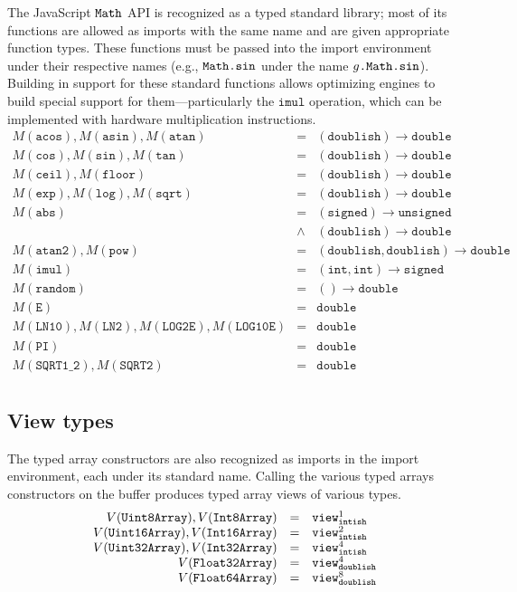 \documentclass{article}
\newcommand{\funty}[2]{({#1}) \rightarrow {#2}}
\newcommand{\mathjs}[1]{\mbox{\texttt{{#1}}}}
\newcommand{\mathjssm}[1]{\mbox{\texttt{\scriptsize {#1}}}}
\newcommand{\unsigned}{\mathtt{unsigned}}
\newcommand{\intsm}{\mathjssm{intish}}
\newcommand{\doublesm}{\mathjssm{doublish}}
\newcommand{\signed}{\mathtt{signed}}
\newcommand{\double}{\mathtt{double}}
\newcommand{\view}[2]{\mathtt{view}^{#1}_{#2}}
\renewcommand{\int}{\mathtt{int}}
\newcommand{\imul}{\mathtt{imul}}
\newcommand{\doublish}{\mathtt{doublish}}
\begin{document}
The JavaScript $\mathjs{Math}$ API is recognized as a typed standard
library; most of its functions are allowed as imports with the same
name and are given appropriate function types. These functions must be
passed into the import environment under their respective names (e.g.,
$\mathjs{Math.sin}$ under the name $g\mathjs{.Math.sin}$). Building in
support for these standard functions allows optimizing engines to
build special support for them---particularly the $\imul$ operation,
which can be implemented with hardware multiplication instructions.
\[
\begin{array}{rcl}
M(\mathtt{acos}), M(\mathtt{asin}), M(\mathtt{atan}) & = & \funty{\doublish}{\double} \\
M(\mathtt{cos}), M(\mathtt{sin}), M(\mathtt{tan})    & = & \funty{\doublish}{\double} \\
M(\mathtt{ceil}), M(\mathtt{floor})                  & = & \funty{\doublish}{\double} \\
M(\mathtt{exp}), M(\mathtt{log}), M(\mathtt{sqrt})   & = & \funty{\doublish}{\double} \\
M(\mathtt{abs}) & =     & \funty{\signed}{\unsigned} \\
                & \land & \funty{\doublish}{\double} \\
M(\mathtt{atan2}), M(\mathtt{pow}) & = & \funty{\doublish, \doublish}{\double} \\
M(\imul) & = & \funty{\int, \int}{\signed} \\
M(\mathtt{random}) & = & \funty{}{\double} \\
M(\mathtt{E}) & = & \double \\
M(\mathtt{LN10}), M(\mathtt{LN2}), M(\mathtt{LOG2E}), M(\mathtt{LOG10E}) & = & \double \\
M(\mathtt{PI}) & = & \double \\
M(\mathtt{SQRT1\_2}), M(\mathtt{SQRT2}) & = & \double \\
\end{array}
\]

\subsection{View types}

The typed array constructors are also recognized as imports in the
import environment, each under its standard name. Calling the various
typed arrays constructors on the buffer produces typed array views of
various types.
\[
\begin{array}{rcl}
V(\mathtt{Uint8Array}), V(\mathtt{Int8Array})   & = & \view{1}{\intsm} \\
V(\mathtt{Uint16Array}), V(\mathtt{Int16Array}) & = & \view{2}{\intsm} \\
V(\mathtt{Uint32Array}), V(\mathtt{Int32Array}) & = & \view{4}{\intsm} \\
V(\mathtt{Float32Array})                        & = & \view{4}{\doublesm} \\
V(\mathtt{Float64Array})                        & = & \view{8}{\doublesm} \\
\end{array}
\]
\end{document}
